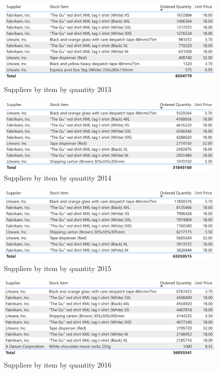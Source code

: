 \documentclass[12pt]{article}
\begin{document}
\begin{figure}[H]
    \centering
    \includegraphics [width=17.5cm]
    {images/Purchases/Supplies by item by quantity2013.png}
    \caption{Suppliers by item by quantity 2013}
    \label{Suppliers by item by quantity 2013}
\end{figure}

\begin{figure}[H]
    \centering
    \includegraphics [width=17.5cm]
    {images/Purchases/Supplies by item by quantity2014.png}
    \caption{Suppliers by item by quantity 2014}
    \label{Suppliers by item by quantity 2014}
\end{figure}

\begin{figure}[H]
    \centering
    \includegraphics [width=17.5cm]
    {images/Purchases/Supplies by item by quantity2015.png}
    \caption{Suppliers by item by quantity 2015}
    \label{Suppliers by item by quantity 2015}
\end{figure}

\begin{figure}[H]
    \centering
    \includegraphics [width=17.5cm]
    {images/Purchases/Supplies by item by quantity2016.png}
    \caption{Suppliers by item by quantity 2016}
    \label{Suppliers by item by quantity 2016}
\end{figure}
\end{document}
